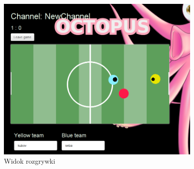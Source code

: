 \begin{figure}[ht]
    \centering
    \includegraphics[width=0.9\textwidth]{imgs/gameView.png}
    \caption{Widok rozgrywki}
    \label{fig:game}
\end{figure}


